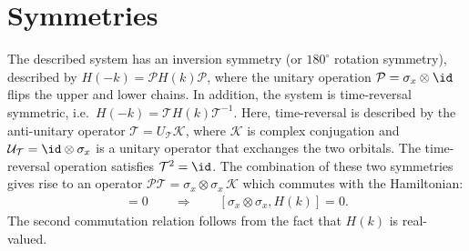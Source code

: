 \section{Symmetries}
The described system has an inversion symmetry (or $180^\circ$ rotation symmetry), described by $H(-k) = \mathcal{P} H(k) \mathcal{P}$, where the unitary operation $\mathcal{P} = \sigma_x \otimes \id$ flips the upper and lower chains.
In addition, the system is time-reversal symmetric, i.e.~$H(-k)=\mathcal{T} H(k) \mathcal{T}^{-1}$.
Here, time-reversal is described by the anti-unitary operator $\mathcal{T}=U_\mathcal{T} \mathcal{K}$, where $\mathcal{K}$ is complex conjugation and $\mathcal{U}_\mathcal{T} = \id \otimes \sigma_x$ is a unitary operator that exchanges the two orbitals.
The time-reversal operation satisfies $\mathcal{T}^2 = \id$.
The combination of these two symmetries gives rise to an operator $\mathcal{P}\mathcal{T} = \sigma_x \otimes \sigma_x \, \mathcal{K}$ which commutes with the Hamiltonian:
\begin{align}
    [\mathcal{P}\mathcal{T}, H(k)] = 0\qquad \Rightarrow \qquad [\sigma_x \otimes \sigma_x, H(k)]= 0.
\end{align}
The second commutation relation follows from the fact that $H(k)$ is real-valued.


